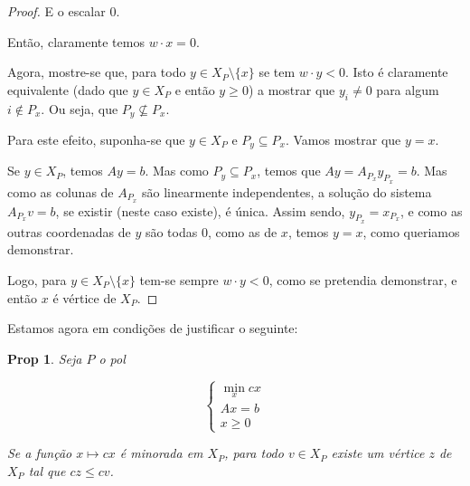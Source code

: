 \documentclass{article}
\newtheorem{prop}{Prop}
\theoremstyle{definition}
\begin{document}
\begin{proof}
	E o escalar $0$.
	
	Então, claramente temos $w \cdot x = 0$.
	
	Agora, mostre-se que, para todo $y \in X_P \setminus \{x\}$ se tem $w \cdot y < 0$. Isto é claramente equivalente (dado que $y \in X_P$ e então $y \geq 0$) a mostrar que $y_i \neq 0$ para algum $i \not \in P_x$. Ou seja, que $P_y \not \subseteq P_x$.
	
	Para este efeito, suponha-se que $y \in X_P$ e $P_y \subseteq P_x$. Vamos mostrar que $y = x$.
	
	Se $y \in X_P$, temos $Ay = b$. Mas como $P_y \subseteq P_x$, temos que $Ay = A_{P_x} y_{P_x} = b$. Mas como as colunas de $A_{P_x}$ são linearmente independentes, a solução do sistema $A_{P_x} v = b$, se existir (neste caso existe), é única. Assim sendo, $y_{P_x} = x_{P_x}$, e como as outras coordenadas de $y$ são todas 0, como as de $x$, temos $y = x$, como queriamos demonstrar.
	
	Logo, para $y \in X_P \setminus \{x\}$ tem-se sempre $w \cdot y < 0$, como se pretendia demonstrar, e então $x$ é vértice de $X_P$.
	\end{proof}
	
	Estamos agora em condições de justificar o seguinte:
	
	\begin{prop}
	Seja $P$ o pol
	
	\[
	\begin{cases}
	\min\limits_x cx\\
	Ax = b\\
	x \geq 0
	\end{cases}
	\]
	
	Se a função $x \mapsto cx$ é minorada em $X_P$, para todo $v \in X_P$ existe um vértice $z$ de $X_P$ tal que $cz \leq cv$.
	\end{prop}
	
\end{document}
